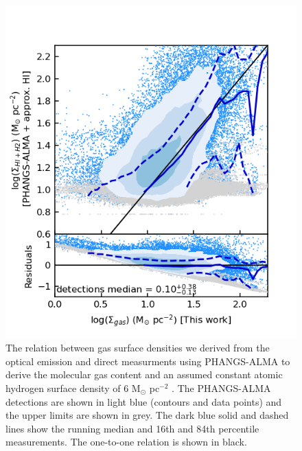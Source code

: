 \documentclass[fleqn,usenatbib]{mnras}
\begin{document}
\begin{figure}
    \centering
    \includegraphics[width=\columnwidth]{figures/fig9.png}
    \caption{The relation between gas surface densities we derived from the optical emission and direct measurments using PHANGS-ALMA to derive the molecular gas content and an assumed constant atomic hydrogen surface density of 6 M$_{\odot}$ pc$^{-2}$ \citep{leroy2021}. The PHANGS-ALMA detections are shown in light blue (contours and data points) and the upper limits are shown in grey. The dark blue solid and dashed lines show the running median and 16th and 84th percentile measurements. The one-to-one relation is shown in black.}
    \label{fig:MUSE_gas_surface_density_comparison_PHANGS_ALMA}
\end{figure}
\end{document}
